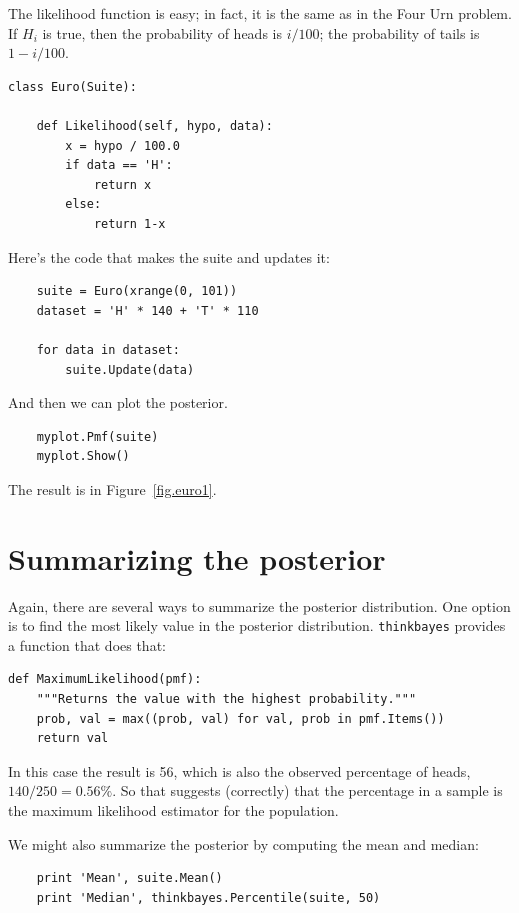 \documentclass[12pt]{book}
\begin{document}
The likelihood function is easy; in fact, it is the same as in
the Four Urn problem.  If $H_i$ is true, then the probability of
heads is $i/100$; the probability of tails is $1- i/100$.

\begin{verbatim}
class Euro(Suite):

    def Likelihood(self, hypo, data):
        x = hypo / 100.0
        if data == 'H':
            return x
        else:
            return 1-x
\end{verbatim}

Here's the code that makes the suite and updates it:

\begin{verbatim}
    suite = Euro(xrange(0, 101))
    dataset = 'H' * 140 + 'T' * 110

    for data in dataset:
        suite.Update(data)
\end{verbatim}

And then we can plot the posterior.

\begin{verbatim}
    myplot.Pmf(suite)
    myplot.Show()
\end{verbatim}

The result is in Figure~\ref{fig.euro1}.


\section{Summarizing the posterior}

Again, there are several ways to summarize the posterior distribution.
One option is to find the most likely value in the posterior
distribution.  \verb"thinkbayes" provides a function that does 
that:

\begin{verbatim}
def MaximumLikelihood(pmf):
    """Returns the value with the highest probability."""
    prob, val = max((prob, val) for val, prob in pmf.Items())
    return val
\end{verbatim}

In this case the result is 56, which is also the observed percentage of
heads, $140/250 = 0.56\%$.  So that suggests (correctly) that the
percentage in a sample is the maximum likelihood estimator
for the population.

We might also summarize the posterior by computing the mean
and median:

\begin{verbatim}
    print 'Mean', suite.Mean()
    print 'Median', thinkbayes.Percentile(suite, 50)
\end{verbatim}
\end{document}
